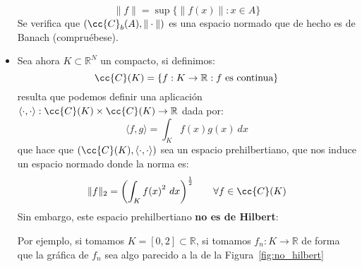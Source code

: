 \begin{itemize}
        \begin{equation*}
            \|f\| = \sup \{\|f(x)\| : x \in A\}
        \end{equation*}
        Se verifica que $(\cc{C}_b(A), \|\cdot \|)$ es una espacio normado que de hecho es de Banach (compruébese). %
    \item Sea ahora $K\subset \mathbb{R}^N$ un compacto, si definimos:
        \begin{equation*}
            \cc{C}(K) = \{f:K\to \mathbb{R}  : f \text{\ es continua}\}
        \end{equation*}
        resulta que podemos definir una aplicación $\langle \cdot ,\cdot  \rangle:\cc{C}(K)\times \cc{C}(K)\to \mathbb{R} $ dada por:
        \begin{equation*}
            \langle f,g \rangle  = \int_K f(x)g(x)~dx
        \end{equation*}
        que hace que $(\cc{C}(K), \langle \cdot ,\cdot  \rangle )$ sea un espacio prehilbertiano, que nos induce un espacio normado donde la norma es:
        \begin{equation*}
            \|f\|_2 = {\left(\int_{K}{f(x)}^{2}~dx \right)}^{\frac{1}{2}} \qquad \forall f\in \cc{C}(K)
        \end{equation*}
        Sin embargo, este espacio prehilbertiano \textbf{no es de Hilbert}:

        Por ejemplo, si tomamos $K = [0,2]\subset \mathbb{R}$, si tomamos $f_n:K\to \mathbb{R}$ de forma que la gráfica de $f_n$ sea algo parecido a la de la Figura~\ref{fig:no_hilbert}

        \begin{figure}[H]
            \centering
\end{figure}
\end{itemize}
